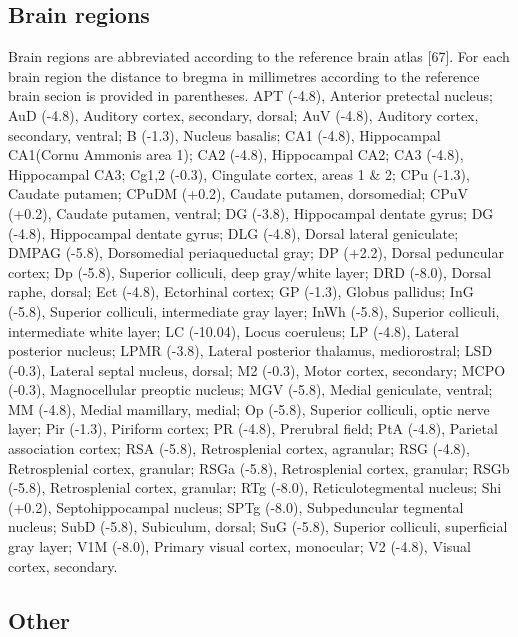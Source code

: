 \documentclass[man]{apa6}
\begin{document}
\hypertarget{brain-regions}{%
\subsection{Brain regions}\label{brain-regions}}

Brain regions are abbreviated according to the reference brain atlas {[}67{]}. For each brain region the distance to bregma in millimetres according to the reference brain secion is provided in parentheses.
APT (-4.8), Anterior pretectal nucleus; AuD (-4.8), Auditory cortex, secondary, dorsal;
AuV (-4.8), Auditory cortex, secondary, ventral; B (-1.3), Nucleus basalis; CA1 (-4.8), Hippocampal CA1(Cornu Ammonis area 1); CA2 (-4.8), Hippocampal CA2; CA3 (-4.8), Hippocampal CA3; Cg1,2 (-0.3), Cingulate cortex, areas 1 \& 2; CPu (-1.3), Caudate putamen; CPuDM (+0.2), Caudate putamen, dorsomedial; CPuV (+0.2), Caudate putamen, ventral; DG (-3.8), Hippocampal dentate gyrus; DG (-4.8), Hippocampal dentate gyrus; DLG (-4.8), Dorsal lateral geniculate; DMPAG (-5.8), Dorsomedial periaqueductal gray; DP (+2.2), Dorsal peduncular cortex; Dp (-5.8), Superior colliculi, deep gray/white layer; DRD (-8.0), Dorsal raphe, dorsal; Ect (-4.8), Ectorhinal cortex; GP (-1.3), Globus pallidus; InG (-5.8), Superior colliculi, intermediate gray layer; InWh (-5.8), Superior colliculi, intermediate white layer; LC (-10.04), Locus coeruleus; LP (-4.8), Lateral posterior nucleus; LPMR (-3.8), Lateral posterior thalamus, mediorostral; LSD (-0.3), Lateral septal nucleus, dorsal; M2 (-0.3), Motor cortex, secondary; MCPO (-0.3), Magnocellular preoptic nucleus; MGV (-5.8), Medial geniculate, ventral; MM (-4.8), Medial mamillary, medial; Op (-5.8), Superior colliculi, optic nerve layer; Pir (-1.3), Piriform cortex; PR (-4.8), Prerubral field; PtA (-4.8), Parietal association cortex; RSA (-5.8), Retrosplenial cortex, agranular; RSG (-4.8), Retrosplenial cortex, granular; RSGa (-5.8), Retrosplenial cortex, granular; RSGb (-5.8), Retrosplenial cortex, granular; RTg (-8.0), Reticulotegmental nucleus; Shi (+0.2), Septohippocampal nucleus; SPTg (-8.0), Subpeduncular tegmental nucleus; SubD (-5.8), Subiculum, dorsal; SuG (-5.8), Superior colliculi, superficial gray layer; V1M (-8.0), Primary visual cortex, monocular; V2 (-4.8), Visual cortex, secondary.

\hypertarget{other}{%
\subsection{Other}\label{other}}
\end{document}
